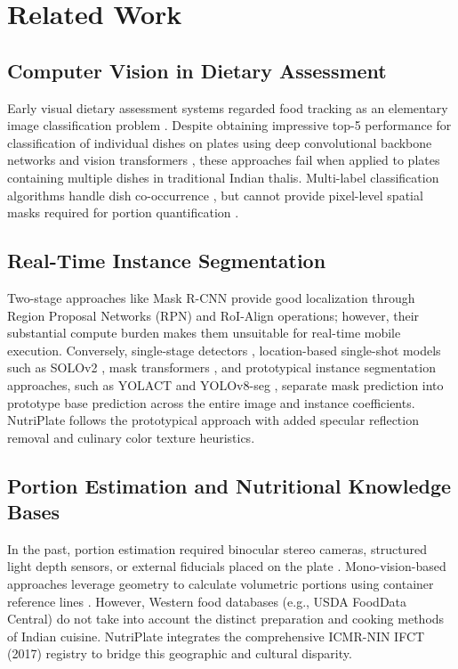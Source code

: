 \documentclass[conference]{IEEEtran}
\begin{document}
\section{Related Work}
\subsection{Computer Vision in Dietary Assessment}
Early visual dietary assessment systems regarded food tracking as an elementary image classification problem \cite{bossard2014food101, mezgec2017nutrinet, chen2016vireofood, kawano2014uecfood}. Despite obtaining impressive top-5 performance for classification of individual dishes on plates using deep convolutional backbone networks \cite{he2016deep} and vision transformers \cite{vaswani2017attention}, these approaches fail when applied to plates containing multiple dishes in traditional Indian thalis. Multi-label classification algorithms handle dish co-occurrence \cite{chen2021deepfood, chen2017chinesefoodnet}, but cannot provide pixel-level spatial masks required for portion quantification \cite{min2019survey, subhi2019deep}.

\subsection{Real-Time Instance Segmentation}
Two-stage approaches like Mask R-CNN \cite{he2017maskrcnn} provide good localization through Region Proposal Networks (RPN) and RoI-Align operations; however, their substantial compute burden makes them unsuitable for real-time mobile execution. Conversely, single-stage detectors \cite{redmon2016yolo, ronneberger2015unet}, location-based single-shot models such as SOLOv2 \cite{wang2020solov2}, mask transformers \cite{cheng2022mask2former}, and prototypical instance segmentation approaches, such as YOLACT \cite{bolte2019yolact} and YOLOv8-seg \cite{terven2023yolo}, separate mask prediction into prototype base prediction across the entire image and instance coefficients. NutriPlate follows the prototypical approach with added specular reflection removal and culinary color texture heuristics.

\subsection{Portion Estimation and Nutritional Knowledge Bases}
In the past, portion estimation required binocular stereo cameras, structured light depth sensors, or external fiducials placed on the plate \cite{puri2009food, dehais2016two, lo2020food}. Mono-vision-based approaches leverage geometry to calculate volumetric portions using container reference lines \cite{fang2019volumetric}. However, Western food databases (e.g., USDA FoodData Central) do not take into account the distinct preparation and cooking methods of Indian cuisine. NutriPlate integrates the comprehensive ICMR-NIN IFCT (2017) registry to bridge this geographic and cultural disparity.
\end{document}
